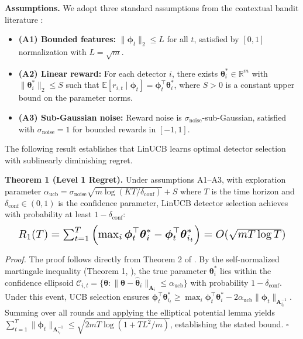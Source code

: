 \documentclass{article}
\begin{document}
\textbf{Assumptions.} We adopt three standard assumptions from the contextual bandit literature \cite{Abbasi2011Improved,Lattimore2020Bandit}:
\begin{itemize}
\item \textbf{(A1) Bounded features:} $\|\boldsymbol{\phi}_t\|_2 \leq L$ for all $t$, satisfied by $[0,1]$ normalization with $L=\sqrt{m}$.
\item \textbf{(A2) Linear reward:} For each detector $i$, there exists $\boldsymbol{\theta}_i^* \in \mathbb{R}^m$ with $\|\boldsymbol{\theta}_i^*\|_2 \leq S$ such that $\mathbb{E}[r_{i,t} \mid \boldsymbol{\phi}_t] = \boldsymbol{\phi}_t^\top \boldsymbol{\theta}_i^*$, where $S > 0$ is a constant upper bound on the parameter norms.
\item \textbf{(A3) Sub-Gaussian noise:} Reward noise is $\sigma_{\text{noise}}$-sub-Gaussian, satisfied with $\sigma_{\text{noise}} = 1$ for bounded rewards in $[-1,1]$.
\end{itemize}

The following result establishes that LinUCB learns optimal detector selection with sublinearly diminishing regret.

\textbf{Theorem 1 (Level 1 Regret).} Under assumptions A1--A3, with exploration parameter $\alpha_{\text{ucb}} = \sigma_{\text{noise}}\sqrt{m \log(KT/\delta_{\text{conf}})} + S$ where $T$ is the time horizon and $\delta_{\text{conf}} \in (0,1)$ is the confidence parameter, LinUCB detector selection achieves with probability at least $1 - \delta_{\text{conf}}$:
\begin{equation}
\resizebox{0.95\columnwidth}{!}{$
R_1(T) = \sum_{t=1}^{T} \left( \max_{i} \boldsymbol{\phi}_t^\top \boldsymbol{\theta}_i^* - \boldsymbol{\phi}_t^\top \boldsymbol{\theta}_{i_t}^* \right) = O(\sqrt{mT \log T})
$}
\end{equation}

\textit{Proof.} The proof follows directly from Theorem 2 of \cite{Abbasi2011Improved}. By the self-normalized martingale inequality (Theorem 1, \cite{Abbasi2011Improved}), the true parameter $\boldsymbol{\theta}_i^*$ lies within the confidence ellipsoid $\mathcal{C}_{i,t} = \{\boldsymbol{\theta}: \|\boldsymbol{\theta} - \hat{\boldsymbol{\theta}}_i\|_{\mathbf{A}_i} \leq \alpha_{\text{ucb}}\}$ with probability $1-\delta_{\text{conf}}$. Under this event, UCB selection ensures $\boldsymbol{\phi}_t^\top \boldsymbol{\theta}_{i_t}^* \geq \max_i \boldsymbol{\phi}_t^\top \boldsymbol{\theta}_i^* - 2\alpha_{\text{ucb}}\|\boldsymbol{\phi}_t\|_{\mathbf{A}_{i_t}^{-1}}$. Summing over all rounds and applying the elliptical potential lemma \cite{Dani2008Stochastic} yields $\sum_{t=1}^T \|\boldsymbol{\phi}_t\|_{\mathbf{A}_{i_t}^{-1}} \leq \sqrt{2mT\log(1+TL^2/m)}$, establishing the stated bound. \hfill $\square$
\end{document}
